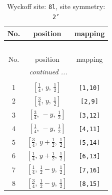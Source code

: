 \documentclass[fleqn,8pt]{jsarticle}
\begin{document}
\begin{longtable}{ccc}
\caption{Wyckoff site: {\tt 8l}, site symmetry: {\tt 2'}}
 \\
 \hline \hline
No. & position & mapping \\ \hline \endfirsthead

\multicolumn{2}{l}{\tablename\ \thetable{}} \\
 \hline \hline
No. & position & mapping \\ \hline \endhead

 \hline \hline
\multicolumn{2}{r}{\footnotesize\it continued ...} \\ \endfoot

 \hline \hline
\multicolumn{2}{r}{} \\ \endlastfoot

1 & $\left[ \frac{1}{4},\, y,\, \frac{1}{2} \right]$ & {\tt [1,10]} \\ \hline
2 & $\left[ \frac{3}{4},\, y,\, \frac{1}{2} \right]$ & {\tt [2,9]} \\ \hline
3 & $\left[ \frac{3}{4},\, - y,\, \frac{1}{2} \right]$ & {\tt [3,12]} \\ \hline
4 & $\left[ \frac{1}{4},\, - y,\, \frac{1}{2} \right]$ & {\tt [4,11]} \\ \hline
5 & $\left[ \frac{3}{4},\, y + \frac{1}{2},\, \frac{1}{2} \right]$ & {\tt [5,14]} \\ \hline
6 & $\left[ \frac{1}{4},\, y + \frac{1}{2},\, \frac{1}{2} \right]$ & {\tt [6,13]} \\ \hline
7 & $\left[ \frac{1}{4},\, \frac{1}{2} - y,\, \frac{1}{2} \right]$ & {\tt [7,16]} \\ \hline
8 & $\left[ \frac{3}{4},\, \frac{1}{2} - y,\, \frac{1}{2} \right]$ & {\tt [8,15]} \\
\end{longtable}
\renewcommand{\arraystretch}{1.2}
\end{document}

